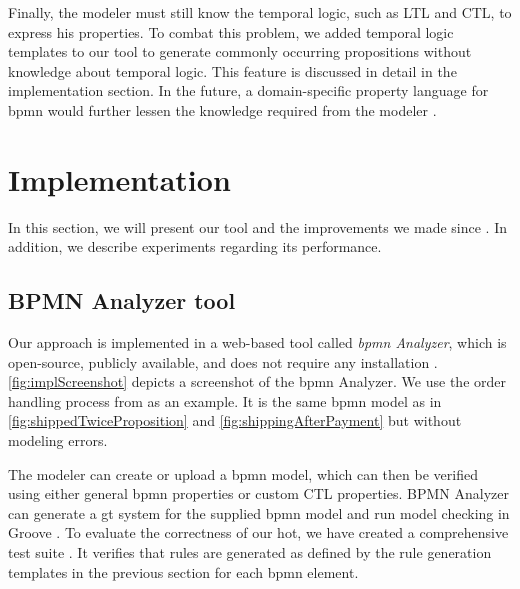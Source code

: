 \documentclass{lmcs} %
\theoremstyle{plain}\newtheorem{satz}[thm]{Satz} %
\begin{document}
Finally, the modeler must still know the temporal logic, such as LTL and CTL, to express his properties.
To combat this problem, we added temporal logic templates to our tool to generate commonly occurring propositions without knowledge about temporal logic.
This feature is discussed in detail in the implementation section.
In the future, a domain-specific property language for \gls*{bpmn} would further lessen the knowledge required from the modeler \cite{meyersProMoBoxFrameworkGenerating2014}.

\section{Implementation} \label{sec:impl}
In this section, we will present our tool and the improvements we made since \cite{krauterFormalizationAnalysisBPMN2023}.
In addition, we describe experiments regarding its performance.

\subsection{BPMN Analyzer tool}

Our approach is implemented in a web-based tool called \textit{\gls*{bpmn} Analyzer}, which is open-source, publicly available, and does not require any installation \cite{krauterArtifactsLMCS2023, krauterFormalizationAnalysisBPMN2023}.
\autoref{fig:implScreenshot} depicts a screenshot of the \gls*{bpmn} Analyzer.
We use the order handling process from \cite{ruckerPracticalProcessAutomation2021} as an example.
It is the same \gls*{bpmn} model as in \autoref{fig:shippedTwiceProposition} and \autoref{fig:shippingAfterPayment} but without modeling errors.

The modeler can create or upload a \gls*{bpmn} model, which can then be verified using either general \gls*{bpmn} properties or custom CTL properties.
BPMN Analyzer can generate a \gls*{gt} system for the supplied \gls*{bpmn} model and run model checking in Groove \cite{kastenbergModelCheckingDynamic2006}. 
To evaluate the correctness of our \gls*{hot}, we have created a comprehensive test suite \cite{krauterArtifactsLMCS2023}.
It verifies that rules are generated as defined by the rule generation templates in the previous section for each \gls*{bpmn} element.
\end{document}
